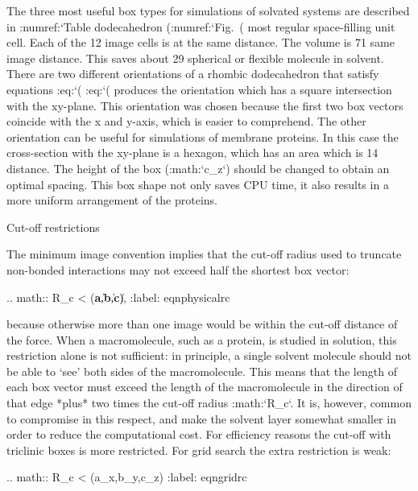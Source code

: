 The three most useful box types for simulations of solvated systems are
described in :numref:`Table %
dodecahedron (:numref:`Fig. (%
most regular space-filling unit cell. Each of the 12 image cells is at
the same distance. The volume is 71%
same image distance. This saves about 29%
spherical or flexible molecule in solvent. There are two different
orientations of a rhombic dodecahedron that satisfy equations
:eq:`(%
:eq:`(%
produces the orientation which has a square intersection with the
xy-plane. This orientation was chosen because the first two box vectors
coincide with the x and y-axis, which is easier to comprehend. The other
orientation can be useful for simulations of membrane proteins. In this
case the cross-section with the xy-plane is a hexagon, which has an area
which is 14%
distance. The height of the box (:math:`c_z`) should be changed to
obtain an optimal spacing. This box shape not only saves CPU time, it
also results in a more uniform arrangement of the proteins.

Cut-off restrictions
~~~~~~~~~~~~~~~~~~~~

The minimum image
convention
implies that the
cut-off radius used to truncate non-bonded interactions may not exceed
half the shortest box vector:

.. math:: R_c < {}\min(\|{\bf a}\|,\|{\bf b}\|,\|{\bf c}\|),
          :label: eqnphysicalrc

because otherwise more than one image would be within the cut-off
distance of the force. When a macromolecule, such as a protein, is
studied in solution, this restriction alone is not sufficient: in
principle, a single solvent molecule should not be able to ‘see’ both
sides of the macromolecule. This means that the length of each box
vector must exceed the length of the macromolecule in the direction of
that edge *plus* two times the cut-off radius :math:`R_c`. It is,
however, common to compromise in this respect, and make the solvent
layer somewhat smaller in order to reduce the computational cost. For
efficiency reasons the cut-off with triclinic boxes is more restricted.
For grid search the extra restriction is weak:

.. math:: R_c < \min(a_x,b_y,c_z)
         :label: eqngridrc
   

